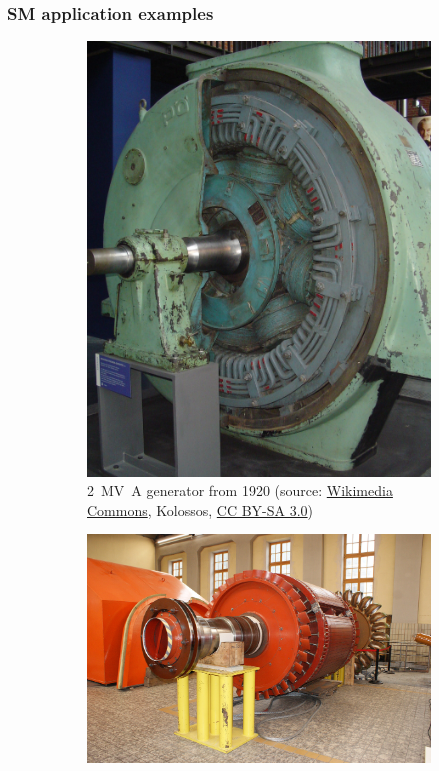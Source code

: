\begin{frame}
	\frametitle{SM application examples}
	\begin{figure}
		\centering
		\begin{subfigure}{0.49\textwidth}
			\centering
			\includegraphics[height=0.55\textheight]{fig/lec07/Salient_pole_rotor.jpg}
			\caption{\SI{2}{\mega\volt\ampere} generator from 1920 (source: \href{hhttps://commons.wikimedia.org/wiki/File:Drehstrom-Synchron-Generator.jpg}{Wikimedia Commons}, Kolossos, \href{https://creativecommons.org/licenses/by-sa/3.0/deed}{CC BY-SA 3.0})}
		\end{subfigure}
		\hfill
		\begin{subfigure}{0.49\textwidth}
			\centering
			\includegraphics[height=0.55\textheight]{fig/lec07/Pelton_wheel_rotor.jpg}

\end{subfigure}
\end{figure}
\end{frame}

